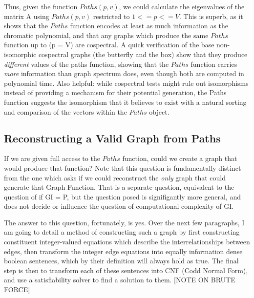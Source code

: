 \documentclass[11pt,a4paper]{report}
\begin{document}
Thus, given the function $Paths(p, v)$, we could calculate the eigenvalues of the matrix A using $Paths(p, v)$ restricted to $1 <= p <= V$. 
This is superb, as it shows that the $Paths$ function encodes at least as much information as the chromatic polynomial, and that any graphs which produce the same $Paths$ function up to (p = V) are cospectral. 
A quick verification of the base non-isomorphic cospectral graphs (the butterfly and the box) show that they produce \emph{different} values of the paths function, showing that the $Paths$ function carries \emph{more} information than graph spectrum does, even though both are computed in polynomial time. 
Also helpful: while cospectral tests might rule out isomorphisms instead of providing a mechanism for their potential generation, the Paths function suggests the isomorphism that it believes to exist with a natural sorting and comparison of the vectors within the $Paths$ object.

\subsection{Reconstructing a Valid Graph from Paths}
If we are given full access to the $Paths$ function, could we create a graph that would produce that function?
Note that this question is fundamentally distinct from the one which asks if we could reconstruct the \emph{only} graph that could generate that Graph Function.
That is a separate question, equivalent to the question of if GI = P, but the question posed is signifigantly more general, and does not decide or influence the question of computational complexity of GI.

The answer to this question, fortunately, is yes.  
Over the next few paragraphs, I am going to detail a method of constructing such a graph by first constructing constituent integer-valued equations which describe the interrelationships between edges, then transform the integer edge equations into equally information dense boolean sentences, which by their definition will always hold as true.  
The final step is then to transform each of these sentences into CNF (Codd Normal Form), and use a satisfiability solver to find a solution to them.
[NOTE ON BRUTE FORCE]
\end{document}
